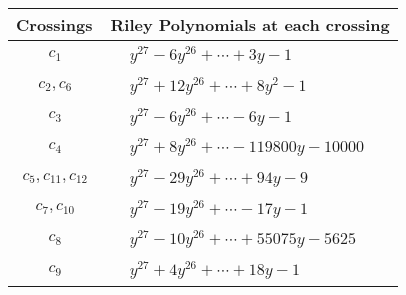 \documentclass[1p]{elsarticle_modified}
\theoremstyle{definition}
\begin{document}
\begin{tabular}{m{50pt}|m{274pt}}
Crossings & \hspace{64pt}Riley Polynomials at each crossing \\
\hline $$\begin{aligned}c_{1}\end{aligned}$$&$\begin{aligned}
&y^{27}-6 y^{26}+\cdots+3 y-1
\end{aligned}$\\
\hline $$\begin{aligned}c_{2},c_{6}\end{aligned}$$&$\begin{aligned}
&y^{27}+12 y^{26}+\cdots+8 y^2-1
\end{aligned}$\\
\hline $$\begin{aligned}c_{3}\end{aligned}$$&$\begin{aligned}
&y^{27}-6 y^{26}+\cdots-6 y-1
\end{aligned}$\\
\hline $$\begin{aligned}c_{4}\end{aligned}$$&$\begin{aligned}
&y^{27}+8 y^{26}+\cdots-119800 y-10000
\end{aligned}$\\
\hline $$\begin{aligned}c_{5},c_{11},c_{12}\end{aligned}$$&$\begin{aligned}
&y^{27}-29 y^{26}+\cdots+94 y-9
\end{aligned}$\\
\hline $$\begin{aligned}c_{7},c_{10}\end{aligned}$$&$\begin{aligned}
&y^{27}-19 y^{26}+\cdots-17 y-1
\end{aligned}$\\
\hline $$\begin{aligned}c_{8}\end{aligned}$$&$\begin{aligned}
&y^{27}-10 y^{26}+\cdots+55075 y-5625
\end{aligned}$\\
\hline $$\begin{aligned}c_{9}\end{aligned}$$&$\begin{aligned}
&y^{27}+4 y^{26}+\cdots+18 y-1
\end{aligned}$\\
\hline
\end{tabular}\\~\\
\end{document}
